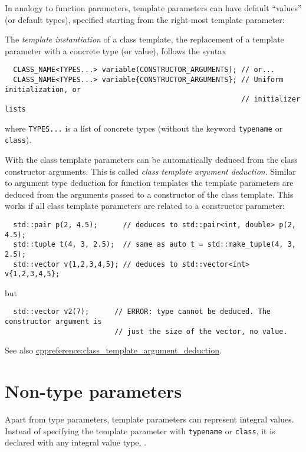 \begin{rem}
  In analogy to function parameters, template parameters can have default ``values'' (or default types), specified starting from the right-most template
  parameter:
\end{rem}

The \emph{template instantiation} of a class template, \ie the replacement of a template parameter with a concrete type (or value), follows the syntax
\begin{verbatim}
  CLASS_NAME<TYPES...> variable(CONSTRUCTOR_ARGUMENTS); // or...
  CLASS_NAME<TYPES...> variable{CONSTRUCTOR_ARGUMENTS}; // Uniform initialization, or
                                                        // initializer lists
\end{verbatim}
where \texttt{TYPES...} is a list of concrete types (without the keyword \texttt{typename} or \texttt{class}).

\begin{rem}
  With \marginpar{[\cxx{17}]} the class template parameters can be automatically deduced from the class constructor arguments. This
  is called \emph{class template argument deduction}. Similar to argument type deduction for function templates the template parameters
  are deduced from the arguments passed to a constructor of the class template. This works if all class template parameters are related to
  a constructor parameter:
  \begin{verbatim}
  std::pair p(2, 4.5);      // deduces to std::pair<int, double> p(2, 4.5);
  std::tuple t(4, 3, 2.5);  // same as auto t = std::make_tuple(4, 3, 2.5);
  std::vector v{1,2,3,4,5}; // deduces to std::vector<int> v{1,2,3,4,5};
  \end{verbatim}
  but
  \begin{verbatim}
  std::vector v2(7);      // ERROR: type cannot be deduced. The constructor argument is
                          // just the size of the vector, no value.
  \end{verbatim}

  See also \href{https://en.cppreference.com/w/cpp/language/class_template_argument_deduction}{cppreference:class\_template\_argument\_deduction}.
\end{rem}



\section{Non-type parameters}\label{sec:non_type_parameters}
Apart from type parameters, template parameters can represent integral values. Instead of specifying the template parameter with \texttt{typename} or
\texttt{class}, it is declared with any integral value type, \eg {}.

